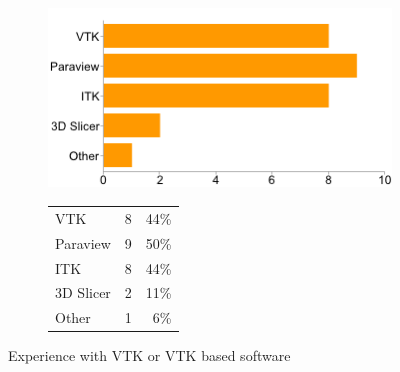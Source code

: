 \documentclass[MSc,paper=a4,pagesize=auto]{icldt}
\begin{document}
\clearpage
\begin{figure}[htbp!]
\centering
\begin{subfigure}{0.4\textwidth}
    \centering
    \includegraphics[width=1\linewidth]{resources/2-vtk_experience}
\end{subfigure}%
\centering
\begin{subfigure}{\textwidth}
    \centering
   	\begin{tabular}{ l c r }
   	VTK 			& 8 & 44\% \\
  	Paraview 	& 9 & 50\% \\
	ITK 			& 8 & 44\% \\
	3D Slicer 	& 2 & 11\% \\
	Other 		&  1 & 6\% \\
\end{tabular}
\end{subfigure} 
    \caption{Experience with VTK or VTK based software}
    \label{fig:2-vtk_experience}
\end{figure}
\end{document}
